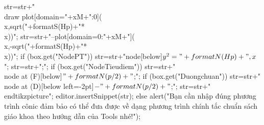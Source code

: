 {{{			str=str+"\n\\draw plot[domain="+xM+":0](\\x,{sqrt("+formatS(Hp)+"*\\x)})";
			str=str+"\n--plot[domain=0:"+xM+"](\\x,{-sqrt("+formatS(Hp)+"*\\x)})";
			if (box.get("NodePT"))
			str=str+"\n node[below]{$y^2="+formatN(Hp)+"\\,x$}";
			str=str+";";
			if (box.get("NodeTieudiem"))
			str=str+"\n\\node at (F)[below]{$"+formatN(p/2)+"$};";
			if (box.get("Duongchuan"))
			str=str+"\n\\node at (D)[below left=-2pt]{$-"+formatN(p/2)+"$};";
			str=str+"\n\\end{tikzpicture}";
			editor.insertSnippet(str);
		}
		else {
			alert("Bạn cần nhập đúng phương trình cônic đảm bảo có thể đưa được về dạng phương trình chính tắc chuẩn sách giáo khoa theo hướng dẫn của Tools nhé!");
		}
	}
}